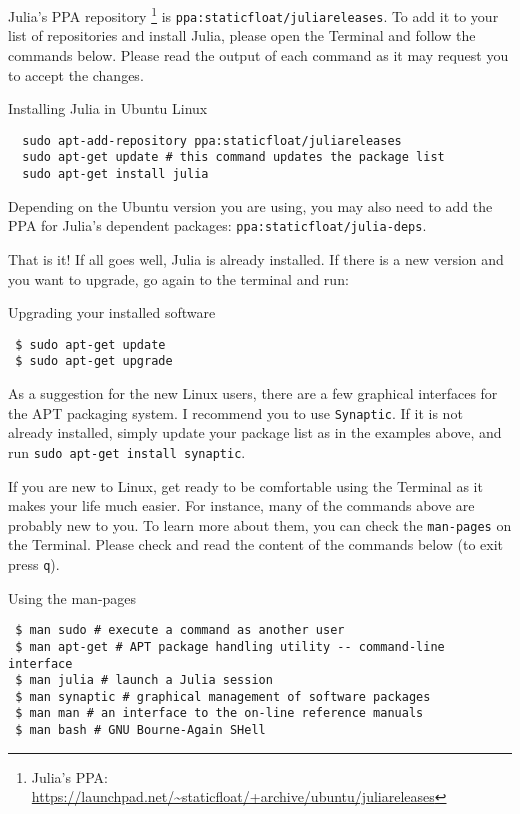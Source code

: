 Julia's PPA repository
\footnote{Julia's PPA: \url{https://launchpad.net/~staticfloat/+archive/ubuntu/juliareleases}}
is \texttt{ppa:staticfloat/juliareleases}. To add it to your list of repositories and install Julia, please open the Terminal and follow the commands below. Please read the output of each command as it may request you to accept the changes.

\begin{example}{Installing Julia in Ubuntu Linux}
 \label{ex:InstallJuliaLinux}
 \begin{verbatim}
  sudo apt-add-repository ppa:staticfloat/juliareleases
  sudo apt-get update # this command updates the package list
  sudo apt-get install julia
 \end{verbatim}
\end{example}
 
Depending on the Ubuntu version you are using, you may also need to add the PPA for Julia's dependent packages: \texttt{ppa:staticfloat/julia-deps}.

That is it! If all goes well, Julia is already installed. If there is a new version and you want to upgrade, go again to the terminal and run:

\begin{example}{Upgrading your installed software}
\begin{verbatim}
 $ sudo apt-get update
 $ sudo apt-get upgrade
\end{verbatim}
\end{example}

As a suggestion for the new Linux users, there are a few graphical interfaces for the APT packaging system. I recommend you to use \texttt{Synaptic}. If it is not already installed, simply update your package list as in the examples above, and run \texttt{sudo apt-get install synaptic}.

If you are new to Linux, get ready to be comfortable using the Terminal as it makes your life much easier. For instance, many of the commands above are probably new to you. To learn more about them, you can check the \texttt{man-pages} on the Terminal. Please check and read the content of the commands below (to exit press \texttt{q}).

\begin{example}{Using the man-pages}
\begin{verbatim}
 $ man sudo # execute a command as another user
 $ man apt-get # APT package handling utility -- command-line interface
 $ man julia # launch a Julia session
 $ man synaptic # graphical management of software packages
 $ man man # an interface to the on-line reference manuals
 $ man bash # GNU Bourne-Again SHell
\end{verbatim}
\end{example}

